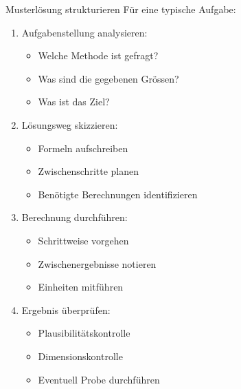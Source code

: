 \begin{example2}{Musterlösung strukturieren}
Für eine typische Aufgabe:
\begin{enumerate}
    \item Aufgabenstellung analysieren:
    \begin{itemize}
        \item Welche Methode ist gefragt?
        \item Was sind die gegebenen Grössen?
        \item Was ist das Ziel?
    \end{itemize}
    
    \item Lösungsweg skizzieren:
    \begin{itemize}
        \item Formeln aufschreiben
        \item Zwischenschritte planen
        \item Benötigte Berechnungen identifizieren
    \end{itemize}
    
    \item Berechnung durchführen:
    \begin{itemize}
        \item Schrittweise vorgehen
        \item Zwischenergebnisse notieren
        \item Einheiten mitführen
    \end{itemize}
    
    \item Ergebnis überprüfen:
    \begin{itemize}
        \item Plausibilitätskontrolle
        \item Dimensionskontrolle
        \item Eventuell Probe durchführen
    \end{itemize}
\end{enumerate}
\end{example2}